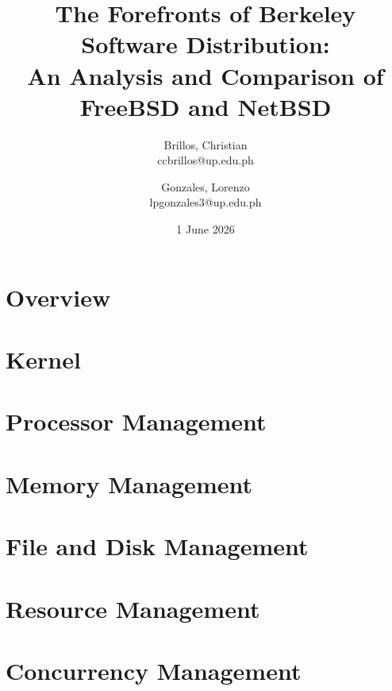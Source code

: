 \documentclass{article}
\title{
    The Forefronts of Berkeley Software Distribution: \\
    An Analysis and Comparison of FreeBSD and NetBSD
}
\author{
    Brillos, Christian \\ ccbrillos@up.edu.ph \and
    Gonzales, Lorenzo \\ lpgonzales3@up.edu.ph
}
\date{1 June 2026}
\begin{document}
\maketitle
\tableofcontents
\newpage

\section{Overview} \label{overview}





\newpage

\section{Kernel} \label{kernel}



\newpage

\section{Processor Management} \label{processor}



\newpage

\section{Memory Management} \label{memory}



\newpage

\section{File and Disk Management} \label{file-and-disk}


\newpage

\section{Resource Management} \label{resource}


\newpage

\section{Concurrency Management} \label{concurrency}

\end{document}
